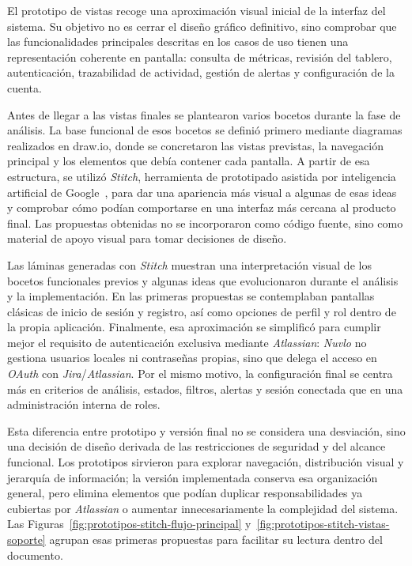 El prototipo de vistas recoge una aproximación visual inicial de la interfaz del sistema. Su objetivo no es cerrar el diseño gráfico definitivo, sino comprobar que las funcionalidades principales descritas en los casos de uso tienen una representación coherente en pantalla: consulta de métricas, revisión del tablero, autenticación, trazabilidad de actividad, gestión de alertas y configuración de la cuenta.


Antes de llegar a las vistas finales se plantearon varios bocetos durante la fase de análisis. La base funcional de esos bocetos se definió primero mediante diagramas realizados en draw.io, donde se concretaron las vistas previstas, la navegación principal y los elementos que debía contener cada pantalla. A partir de esa estructura, se utilizó \textit{Stitch}, herramienta de prototipado asistida por inteligencia artificial de Google~\cite{GoogleStitch}, para dar una apariencia más visual a algunas de esas ideas y comprobar cómo podían comportarse en una interfaz más cercana al producto final. Las propuestas obtenidas no se incorporaron como código fuente, sino como material de apoyo visual para tomar decisiones de diseño.

Las láminas generadas con \textit{Stitch} muestran una interpretación visual de los bocetos funcionales previos y algunas ideas que evolucionaron durante el análisis y la implementación. En las primeras propuestas se contemplaban pantallas clásicas de inicio de sesión y registro, así como opciones de perfil y rol dentro de la propia aplicación. Finalmente, esa aproximación se simplificó para cumplir mejor el requisito de autenticación exclusiva mediante \textit{Atlassian}: \textit{Nuvlo} no gestiona usuarios locales ni contraseñas propias, sino que delega el acceso en \textit{OAuth} con \textit{Jira}/\textit{Atlassian}. Por el mismo motivo, la configuración final se centra más en criterios de análisis, estados, filtros, alertas y sesión conectada que en una administración interna de roles.

Esta diferencia entre prototipo y versión final no se considera una desviación, sino una decisión de diseño derivada de las restricciones de seguridad y del alcance funcional. Los prototipos sirvieron para explorar navegación, distribución visual y jerarquía de información; la versión implementada conserva esa organización general, pero elimina elementos que podían duplicar responsabilidades ya cubiertas por \textit{Atlassian} o aumentar innecesariamente la complejidad del sistema. Las Figuras~\ref{fig:prototipos-stitch-flujo-principal} y~\ref{fig:prototipos-stitch-vistas-soporte} agrupan esas primeras propuestas para facilitar su lectura dentro del documento.

